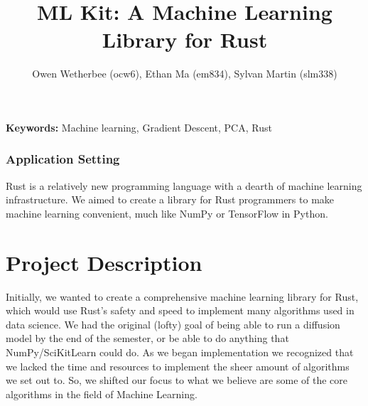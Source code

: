 \documentclass[12pt, letterpaper]{article}
\title{ML Kit: A Machine Learning Library for Rust}
\author{Owen Wetherbee (ocw6), Ethan Ma (em834), Sylvan Martin (slm338)}
\date{}
\theoremstyle{definition}
\theoremstyle{remark}
\begin{document}
\maketitle

\begin{center}
    \textbf{Keywords:} Machine learning, Gradient Descent, PCA, Rust
\end{center}

\subsubsection*{Application Setting}

Rust is a relatively new programming language with a dearth of machine learning infrastructure. We aimed to 
create a library for Rust programmers to make machine learning convenient, much like NumPy or TensorFlow in Python.

\section{Project Description}

Initially, we wanted to create a comprehensive machine learning library for Rust, which would use Rust's safety
and speed to implement many algorithms used in data science. We had the original (lofty) goal of being able to 
run a diffusion model by the end of the semester, or be able to do anything that NumPy/SciKitLearn could do. As 
we began implementation we recognized that we lacked the time and resources to implement the sheer amount of algorithms 
we set out to. So, we shifted our focus to what we believe are some of the core algorithms in the field of 
Machine Learning.
\end{document}
